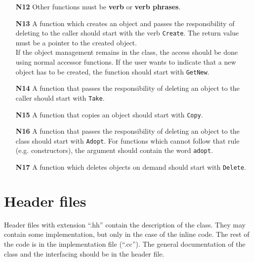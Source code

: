 \documentclass[a4paper,10pt]{article}
\begin{document}
\begin{itemize}
  {\tt SetMomentum(momentum);   // set the value of fMomentum \\
       GetMomentum();           // get the value }\\
  The ``Get'' should be omitted by functions which return a non-const
  reference to indicate that this can also be used as a lvalue.
\item[\bf N12] Other functions must be {\bf verb} or {\bf verb phrases}.
\item[\bf N13] A function which creates an object and passes the responsibility
  of deleting to the caller should start with the verb {\tt Create}. The
  return value must be a pointer to the created object.\\
  If the object management remains in the class, the access should be done
  using normal accessor functions. If the user wants to indicate that a
  new object has to be created, the function should start with {\tt GetNew}.
\item[\bf N14] A function that passes the responsibility of deleting an
  object to the caller should start with {\tt Take}.
\item[\bf N15] A function that copies an object should start with {\tt Copy}.
\item[\bf N16] A function that passes the responsibility of deleting an
  object to the class should start with {\tt Adopt}. For functions which cannot
  follow that rule (e.g. constructors), the argument should contain the
  word {\tt adopt}.
\item[\bf N17] A function which deletes objects on demand should start with
  {\tt Delete}.
\end{itemize}

\section{Header files}

Header files with extension ``.hh'' contain the description of the class.
They may contain some implementation, but only in the case of the inline
code. The rest of the code is in the implementation file (``.cc''). The
general documentation of the class and the interfacing should be in
the header file.
\end{document}
